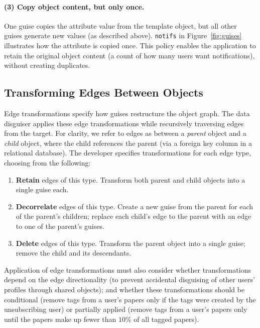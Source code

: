 \paragraph{(3) Copy object content, but only once.} One guise copies the attribute value from the
template object, but all other guises generate new values (as described above).  \texttt{notifs} in
Figure~\ref{fig:guises} illustrates how the attribute is copied once. This policy enables the
application to retain the original object content (\eg a count of how many users want
notifications), without \eg creating duplicates.

\subsection{Transforming Edges Between Objects}
\label{design:edgepol}

Edge transformations specify how guises restructure the object graph.
The data disguiser applies these edge transformations while
recursively traversing edges from the target.  For clarity, we refer to edges as between a
\emph{parent} object and a \emph{child} object, where the child references the parent
(\eg via a foreign key column in a relational database).
%
The developer specifies transformations for each edge type, choosing from the following:
\begin{enumerate}[nosep]
    \item \textbf{Retain} edges of this type. Transform both parent and child objects into a single guise
        each.
    \item \textbf{Decorrelate} edges of this type. Create a new guise from the parent for each of
        the parent's children; replace each child's edge to the parent with an edge to one of the
        parent's guises.
    \item \textbf{Delete} edges of this type. Transform the parent object into a single guise;
        remove the child and its descendants.
\end{enumerate}

Application of edge transformations must also consider whether transformations depend on the edge
directionality (to \eg prevent accidental disguising of other users' profiles through shared objects);
and whether these transformations should be conditional (\eg remove tags from a user's papers only
if the tags were created by the unsubscribing user) or partially applied (\eg remove tags from a
user's papers only until the papers make up fewer than $10$\% of all tagged papers).

